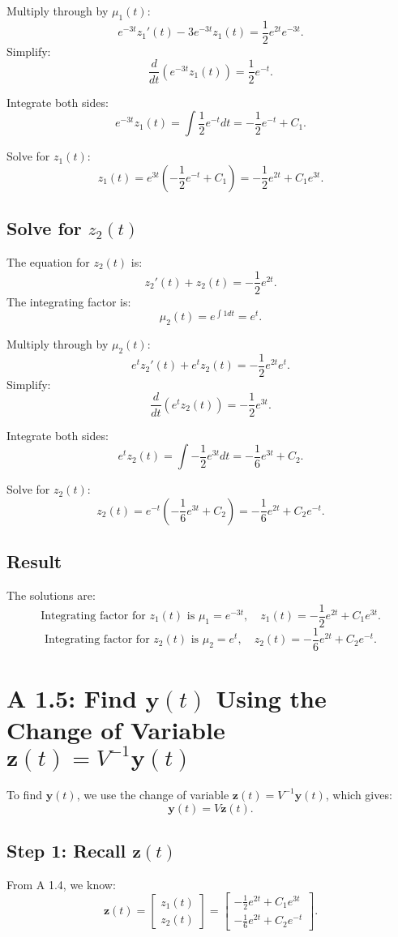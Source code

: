 \documentclass[12pt]{article}
\begin{document}
Multiply through by \(\mu_1(t)\):
\[
e^{-3t}z_1'(t) - 3e^{-3t}z_1(t) = \frac{1}{2}e^{2t}e^{-3t}.
\]
Simplify:
\[
\frac{d}{dt}\left(e^{-3t}z_1(t)\right) = \frac{1}{2}e^{-t}.
\]

Integrate both sides:
\[
e^{-3t}z_1(t) = \int \frac{1}{2}e^{-t}dt = -\frac{1}{2}e^{-t} + C_1.
\]

Solve for \(z_1(t)\):
\[
z_1(t) = e^{3t}\left(-\frac{1}{2}e^{-t} + C_1\right) = -\frac{1}{2}e^{2t} + C_1e^{3t}.
\]

\subsection*{Solve for \(z_2(t)\)}
The equation for \(z_2(t)\) is:
\[
z_2'(t) + z_2(t) = -\frac{1}{2}e^{2t}.
\]
The integrating factor is:
\[
\mu_2(t) = e^{\int 1dt} = e^t.
\]

Multiply through by \(\mu_2(t)\):
\[
e^t z_2'(t) + e^t z_2(t) = -\frac{1}{2}e^{2t}e^t.
\]
Simplify:
\[
\frac{d}{dt}\left(e^t z_2(t)\right) = -\frac{1}{2}e^{3t}.
\]

Integrate both sides:
\[
e^t z_2(t) = \int -\frac{1}{2}e^{3t}dt = -\frac{1}{6}e^{3t} + C_2.
\]

Solve for \(z_2(t)\):
\[
z_2(t) = e^{-t}\left(-\frac{1}{6}e^{3t} + C_2\right) = -\frac{1}{6}e^{2t} + C_2e^{-t}.
\]

\subsection*{Result}
The solutions are:
\[
\text{Integrating factor for } z_1(t) \text{ is } \mu_1 = e^{-3t}, \quad z_1(t) = -\frac{1}{2}e^{2t} + C_1e^{3t}.
\]
\[
\text{Integrating factor for } z_2(t) \text{ is } \mu_2 = e^t, \quad z_2(t) = -\frac{1}{6}e^{2t} + C_2e^{-t}.
\]

\section*{A 1.5: Find \(\mathbf{y}(t)\) Using the Change of Variable \(\mathbf{z}(t) = V^{-1}\mathbf{y}(t)\)}

To find \(\mathbf{y}(t)\), we use the change of variable \(\mathbf{z}(t) = V^{-1}\mathbf{y}(t)\), which gives:
\[
\mathbf{y}(t) = V\mathbf{z}(t).
\]

\subsection*{Step 1: Recall \(\mathbf{z}(t)\)}
From A 1.4, we know:
\[
\mathbf{z}(t) = \begin{bmatrix} z_1(t) \\ z_2(t) \end{bmatrix} = \begin{bmatrix} -\frac{1}{2}e^{2t} + C_1e^{3t} \\ -\frac{1}{6}e^{2t} + C_2e^{-t} \end{bmatrix}.
\]
\end{document}
